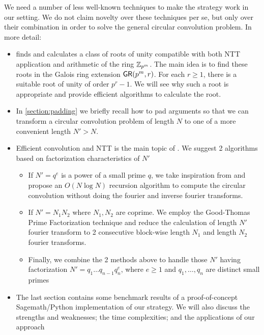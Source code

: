 We need a number of less well-known techniques to make the strategy work in our setting. We do not claim novelty over these techniques per se, but only over their combination in order to solve the general circular convolution problem. In more detail:
\begin{itemize}
    \item {} finds and calculates a class of roots of unity compatible with both NTT application and arithmetic of the ring \(\mathbb{Z}_{p^m}\). The main idea is to find these roots in the Galois ring extension \(\mathsf{GR}(p^m, r)\). For each \(r \ge 1\), there is a suitable root of unity of order \(p^r - 1\). We will see why such a root is appropriate and provide efficient algorithms to calculate the root.
    \item In \cref{section:padding} we briefly recall how to pad arguments so that we can transform a circular convolution problem of length \(N\) to one of a more convenient length \(N' > N\).
    \item Efficient convolution and NTT is the main topic of . We suggest 2 algorithms based on factorization characteristics of \(N'\)
    \begin{itemize}
        \item If \(N' = q^e\) is a power of a small prime \(q\), we take inspiration from \cite{ARXIV:Rosowski21} and propose an \(O(N \log N)\) recursion algorithm to compute the circular convolution without doing the fourier and inverse fourier transforms.
        \item If \(N' = N_1 N_2\) where \(N_1, N_2\) are coprime. We employ the Good-Thomas Prime Factorization technique \cite{JRSS:Good58,ADC:Thomas63} and reduce the calculation of length \(N'\) fourier transform to 2 consecutive block-wise length \(N_1\) and length \(N_2\) fourier transforms.
        \item Finally, we combine the 2 methods above to handle those \(N'\) having factorization \(N' = q_1 \ldots q_{n-1} q_n^e\), where \(e \ge 1\) and \(q_1, \ldots, q_n\) are distinct small primes
    \end{itemize}
    \item The last section contains some benchmark results of a proof-of-concept Sagemath/Python implementation of our strategy. We will also discuss the strengths and weaknesses; the time complexities; and the applications of our approach
\end{itemize}

